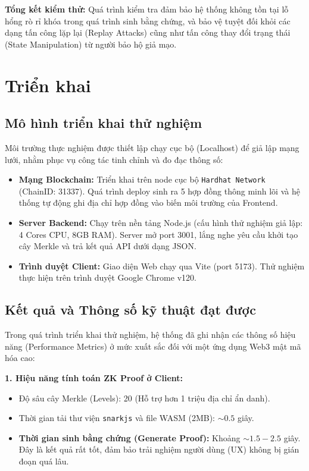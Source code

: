 \documentclass[../DoAn.tex]{subfiles}
\begin{document}
\textbf{Tổng kết kiểm thử:} Quá trình kiểm tra đảm bảo hệ thống không tồn tại lỗ hổng rò rỉ khóa trong quá trình sinh bằng chứng, và bảo vệ tuyệt đối khỏi các dạng tấn công lặp lại (Replay Attacks) cũng như tấn công thay đổi trạng thái (State Manipulation) từ người bảo hộ giả mạo.

\section{Triển khai}
\subsection{Mô hình triển khai thử nghiệm}
Môi trường thực nghiệm được thiết lập chạy cục bộ (Localhost) để giả lập mạng lưới, nhằm phục vụ công tác tinh chỉnh và đo đạc thông số:
\begin{itemize}
    \item \textbf{Mạng Blockchain:} Triển khai trên node cục bộ \texttt{Hardhat Network} (ChainID: 31337). Quá trình deploy sinh ra 5 hợp đồng thông minh lõi và hệ thống tự động ghi địa chỉ hợp đồng vào biến môi trường của Frontend.
    \item \textbf{Server Backend:} Chạy trên nền tảng Node.js (cấu hình thử nghiệm giả lập: 4 Cores CPU, 8GB RAM). Server mở port 3001, lắng nghe yêu cầu khởi tạo cây Merkle và trả kết quả API dưới dạng JSON.
    \item \textbf{Trình duyệt Client:} Giao diện Web chạy qua Vite (port 5173). Thử nghiệm thực hiện trên trình duyệt Google Chrome v120.
\end{itemize}

\subsection{Kết quả và Thông số kỹ thuật đạt được}
Trong quá trình triển khai thử nghiệm, hệ thống đã ghi nhận các thông số hiệu năng (Performance Metrics) ở mức xuất sắc đối với một ứng dụng Web3 mật mã hóa cao:

\textbf{1. Hiệu năng tính toán ZK Proof ở Client:}
\begin{itemize}
    \item Độ sâu cây Merkle (Levels): 20 (Hỗ trợ hơn 1 triệu địa chỉ ẩn danh).
    \item Thời gian tải thư viện \texttt{snarkjs} và file WASM (2MB): $\sim 0.5$ giây.
    \item \textbf{Thời gian sinh bằng chứng (Generate Proof):} Khoảng $\sim 1.5 - 2.5$ giây. Đây là kết quả rất tốt, đảm bảo trải nghiệm người dùng (UX) không bị gián đoạn quá lâu.
\end{itemize}
\end{document}
